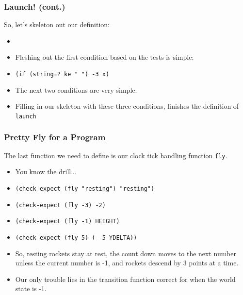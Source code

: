 \documentclass{beamer}
\begin{document}
\launchSimple{
\begin{verbatim}
    [(<= -3 x -1) x]
    [(>= x 0) x]
\end{verbatim}
}

\begin{frame}
  \frametitle{Launch! (cont.)}
  So, let's skeleton out our definition:
  \begin{itemize}
  \item<2-> \launchSkeleton
  \item<3-> Fleshing out the first condition based on the tests is simple:
  \item<4-> \texttt{(if (string=? ke " ") -3 x)}
  \item<5-> The next two conditions are very simple:
    \launchSimple
  \item<6-> Filling in our skeleton with these three conditions,
    finishes the definition of \texttt{launch}
  \end{itemize}
\end{frame}

\begin{frame}
  \frametitle{Pretty Fly for a Program}
  The last function we need to define is our clock tick handling
  function \texttt{fly}.
  \begin{itemize}
  \item<2-> You know the drill...
  \item<3-> \texttt{(check-expect (fly "resting") "resting")}
  \item<4-> \texttt{(check-expect (fly -3) -2)}
  \item<5-> \texttt{(check-expect (fly -1) HEIGHT)}
  \item<6-> \texttt{(check-expect (fly 5) (- 5 YDELTA))}
  \item<7-> So, resting rockets stay at rest, the count down
    moves to the next number unless the current number is -1, and rockets descend by 3 points at a time.
  \item<8-> Our only trouble lies in the transition function correct
    for when the world state is -1.
  \end{itemize}
\end{frame}

\end{document}
